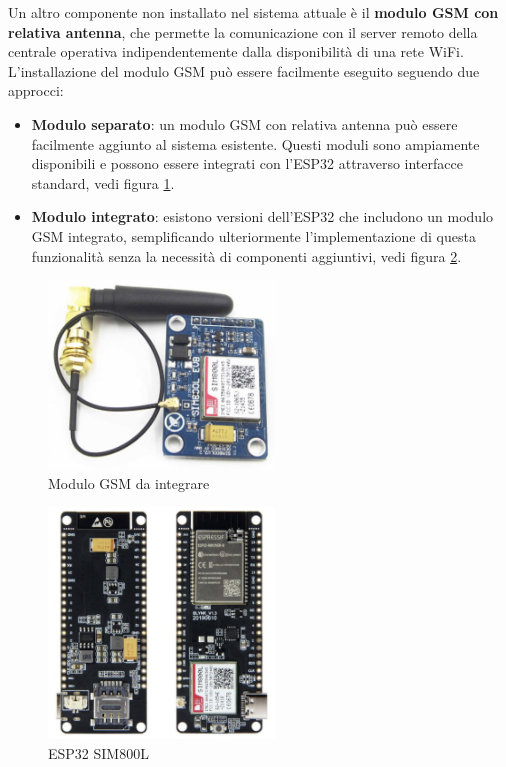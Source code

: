 \documentclass[12pt, a4paper, italian]{report}
\numberwithin{figure}{chapter}
\numberwithin{table}{chapter}
\begin{document}
Un altro componente non installato nel sistema attuale è il \textbf{modulo GSM con relativa antenna}, che permette la comunicazione con il server remoto della centrale operativa indipendentemente dalla disponibilità di una rete WiFi.
L'installazione del modulo GSM può essere facilmente eseguito seguendo due approcci: 

\begin{itemize}
    \item \textbf{Modulo separato}: un modulo GSM con relativa antenna può essere facilmente aggiunto al sistema esistente. Questi moduli sono ampiamente disponibili e possono essere integrati con l'ESP32 attraverso interfacce standard, vedi figura  \ref{fig:modulo_gsm}.
    \item \textbf{Modulo integrato}: esistono versioni dell'ESP32 che includono un modulo GSM integrato, semplificando ulteriormente l'implementazione di questa funzionalità senza la necessità di componenti aggiuntivi, vedi figura \ref{fig:esp32_gsm}.
\end{itemize}

\begin{figure}[h]
  \centering
  \includegraphics[width=6cm]{gsm_module.png}
  \caption{Modulo GSM da integrare}
  \label{fig:modulo_gsm}
\end{figure}

\begin{figure}[h]
  \centering
  \includegraphics[width=6cm]{esp32_gsm.png}
  \caption{ESP32 SIM800L}
  \label{fig:esp32_gsm}
\end{figure}
\end{document}
